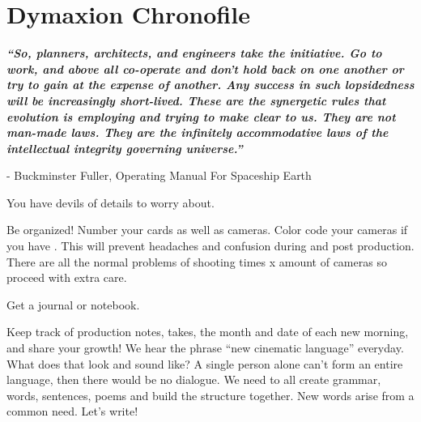 \section{Dymaxion Chronofile}
\pagecolor{white}
\label{chap:27}
\begin{fullwidth}

{\itshape\bfseries “So, planners, architects, and engineers take the initiative. Go to work, and above all co-operate and don't hold back on one another or try to gain at the expense of another. Any success in such lopsidedness will be increasingly short-lived. These are the synergetic rules that evolution is employing and trying to make clear to us. They are not man-made laws. They are the infinitely accommodative laws of the intellectual integrity governing universe.”}

- Buckminster Fuller, Operating Manual For Spaceship Earth
\vspace{\baselineskip}

\problem

{\large You have devils of details to worry about. \par}

Be organized! Number your cards as well as cameras. Color code your cameras if you have \textbf{}. This will prevent headaches and confusion during \textbf{} and post production. There are all the normal problems of shooting times x amount of cameras so proceed with extra care.

\solution

{\large Get a journal or notebook. \par}

Keep track of production notes, takes, the month and date of each new morning, and share your growth! We hear the phrase “new cinematic language” everyday. What does that look and sound like? A single person alone can’t form an entire language, then there would be no dialogue. We need to all create grammar, words, sentences, poems and build the structure together. New words arise from a common need. Let’s write! 

\clearpage
\end{fullwidth}
